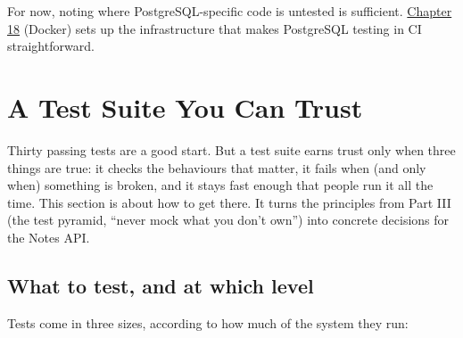 \noindent{}For now, noting where PostgreSQL-specific code is untested is sufficient. \hyperref[ch:18-containerization]{Chapter 18} (Docker) sets up the infrastructure that makes PostgreSQL testing in CI straightforward.

\setcounter{section}{7}
\section{A Test Suite You Can Trust}\label{17-build-process:178-a-test-suite-you-can-trust}

Thirty passing tests are a good start. But a test suite earns trust only when three things are true: it checks the behaviours that matter, it fails when (and only when) something is broken, and it stays fast enough that people run it all the time. This section is about how to get there. It turns the principles from Part III (the test pyramid, ``never mock what you don't own'') into concrete decisions for the Notes API.

\subsection*{What to test, and at which level}\label{17-build-process:what-to-test-and-at-which-level}

Tests come in three sizes, according to how much of the system they run:


